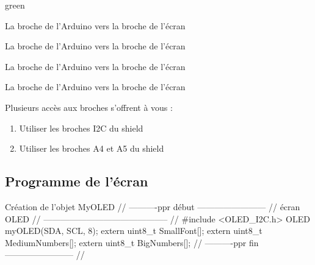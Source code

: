 \begin{items}{green}{\Circle}
    \item La broche  de l'Arduino vers la broche  de l'écran
    \item La broche  de l'Arduino vers la broche  de l'écran
    \item La broche  de l'Arduino vers la broche de l'écran
    \item La broche  de l'Arduino vers la broche  de l'écran
\end{items}




Plusieurs accès aux broches s'offrent à vous : 
\begin{enumerate}
\item Utiliser les broches I2C du shield

\item Utiliser les broches A4 et A5 du shield

\end{enumerate}


\subsection{Programme de l'écran}
\begin{Cpp}{Création de l'objet MyOLED}
    // ----------ppr début ------------------------
    // écran OLED
    // --------------------------------------------
    //
    #include <OLED_I2C.h>
    OLED  myOLED(SDA, SCL, 8);
    extern uint8_t SmallFont[];
    extern uint8_t MediumNumbers[];
    extern uint8_t BigNumbers[];
    // ----------ppr fin   ------------------------
    //
\end{Cpp}

